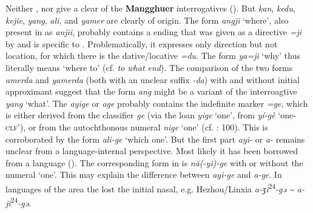 Neither \cite{Slater2003a,Slater2003b}, nor \cite{Dpal-ldan-bkra-shis1996} give a clear  of the \textbf{Mangghuer} interrogatives (). But \textit{kan}, \textit{kedu}, \textit{kejie}, \textit{yang}, \textit{ali}, and \textit{yamer} are clearly of  origin. The form \textit{angji} ‘where’, also present in  as \textit{anjii}, probably contains a  ending that was given as a directive \textit{=ji} by \citet[312]{Slater2003b} and is specific to . Problematically, it expresses only direction but not location, for which there is the dative/locative \textit{=du}. The form \textit{ya=ji} ‘why’ thus literally means ‘where to’ (cf.  \textit{to what end}). The comparison of the two forms \textit{amerda} and \textit{yamerda} (both with an unclear suffix \textit{-da}) with and without initial approximant suggest that the form \textit{ang} might be a variant of the interroagtive \textit{yang} ‘what’. The  \textit{ayige} or \textit{age} probably contains the indefinite  marker \textit{=ge}, which is either derived from the  classifier \textit{ge}  (via the loan \textit{yige} ‘one’, from \textit{yí-gè} ‘one-\textsc{clf}’), or from the autochthonous numeral \textit{nige} ‘one’ (cf. \citealt{Slater2003a}: 100). This  is corroborated by the form \textit{ali-ge} ‘which one’. But the first part \textit{ayi-} or \textit{a-} remains unclear from a language-internal perspective. Most likely it has been borrowed from a  language (). The corresponding form in  is \textit{nă(-yi)-ge} with or without the numeral ‘one’. This may explain the difference between \textit{ayi-ge} and \textit{a-ge}. In  languages of the area the  lost the initial nasal, e.g. Hezhou/Linxia \textit{a-ʒi}\textsuperscript{24}\textit{-gə {\textasciitilde} a-ji}\textsuperscript{24}\textit{-gə}.
\clearpage %